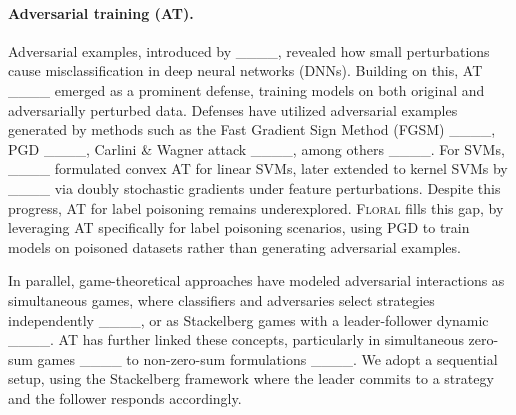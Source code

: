 \paragraph{Adversarial training (AT).} 
Adversarial examples, introduced by ____, revealed how small perturbations cause misclassification in deep neural networks (DNNs).
Building on this, AT ____ emerged as a prominent defense, training models on both original and adversarially perturbed data.
Defenses have utilized adversarial examples generated by methods such as the Fast Gradient Sign Method (FGSM) ____, PGD ____, Carlini \& Wagner attack ____, among others ____.
For SVMs, ____ formulated convex AT for linear SVMs, later extended to kernel SVMs by ____ via doubly stochastic gradients under feature perturbations.
Despite this progress, AT for label poisoning remains underexplored.
\textsc{Floral} fills this gap, by leveraging AT specifically for label poisoning scenarios, using PGD to train models on poisoned datasets rather than generating adversarial examples.

In parallel, game-theoretical approaches have modeled adversarial interactions 
as simultaneous games, where classifiers and adversaries select strategies independently
____, or as Stackelberg games with a leader-follower dynamic ____. 
AT has further linked these concepts, particularly in simultaneous zero-sum games ____ to non-zero-sum formulations ____.
We adopt a sequential setup, using the Stackelberg framework where the leader commits to a strategy and the follower responds accordingly.
